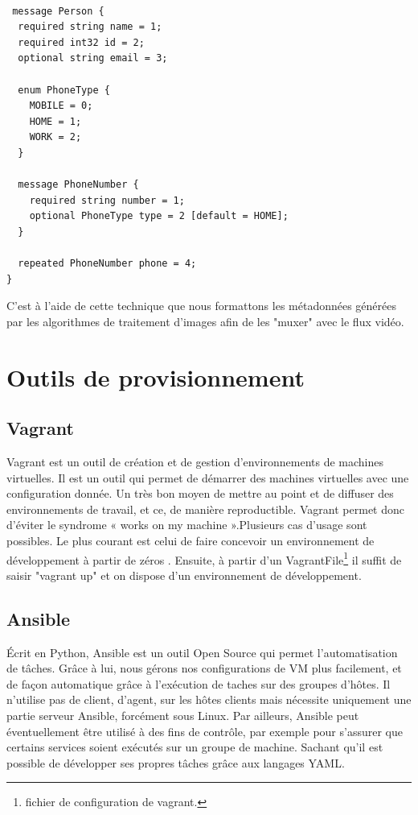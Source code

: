 \begin{lstlisting}[language=protobuf2,style=protobuf , frame=single,caption=modèle pour la structure d'un message,label=proto1]

 message Person {
  required string name = 1;
  required int32 id = 2;
  optional string email = 3;

  enum PhoneType {
    MOBILE = 0;
    HOME = 1;
    WORK = 2;
  }

  message PhoneNumber {
    required string number = 1;
    optional PhoneType type = 2 [default = HOME];
  }

  repeated PhoneNumber phone = 4;
}
\end{lstlisting}

C'est à l'aide de cette technique que nous formattons les métadonnées générées par les algorithmes de traitement d'images afin de les "muxer" avec le flux vidéo.

\section{Outils de provisionnement}

\subsection{Vagrant}
Vagrant est un outil de création et de gestion d'environnements de machines virtuelles. Il est un outil qui permet de démarrer des machines virtuelles avec une configuration donnée. Un très bon moyen de mettre au point et de diffuser des environnements de travail, et ce, de manière reproductible. Vagrant permet donc d'éviter le syndrome « works on my machine ».Plusieurs cas d'usage sont possibles. Le plus courant est celui de faire concevoir un environnement de développement à partir de zéros . Ensuite, à partir d'un VagrantFile\footnote{fichier de configuration de vagrant.} il suffit de saisir "vagrant up" et on dispose d'un environnement de développement.

\subsection{Ansible}
Écrit en Python, Ansible est un outil Open Source qui permet l’automatisation de tâches. Grâce à lui, nous gérons nos configurations de VM plus facilement, et de façon automatique grâce à l’exécution de taches sur des groupes d’hôtes. Il n’utilise pas de client, d’agent, sur les hôtes clients mais nécessite uniquement une partie serveur Ansible, forcément sous Linux. Par ailleurs, Ansible peut éventuellement être utilisé à des fins de contrôle, par exemple pour s’assurer que certains services soient exécutés sur un groupe de machine. Sachant qu’il est possible de développer ses propres tâches grâce aux langages YAML.



